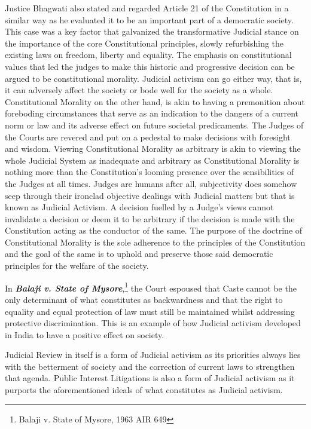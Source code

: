 \begin{multicols}{2}
\noi
Justice Bhagwati also stated and regarded Article 21 of the Constitution in a similar way as
he evaluated it to be an important part of a democratic society. This case was a key factor that
galvanized the transformative Judicial stance on the importance of the core Constitutional
principles, slowly refurbishing the existing laws on freedom, liberty and equality. The
emphasis on constitutional values that led the judges to make this historic and progressive
decision can be argued to be constitutional morality. Judicial activism can go either way, that
is, it can adversely affect the society or bode well for the society as a whole. Constitutional
Morality on the other hand, is akin to having a premonition about foreboding circumstances
that serve as an indication to the dangers of a current norm or law and its adverse effect on
future societal predicaments. The Judges of the Courts are revered and put on a pedestal to
make decisions with foresight and wisdom. Viewing Constitutional Morality as arbitrary is
akin to viewing the whole Judicial System as inadequate and arbitrary as Constitutional
Morality is nothing more than the Constitution’s looming presence over the sensibilities of
the Judges at all times. Judges are humans after all, subjectivity does somehow seep through
their ironclad objective dealings with Judicial matters but that is known as Judicial Activism.
A decision fuelled by a Judge’s views cannot invalidate a decision or deem it to be arbitrary
if the decision is made with the Constitution acting as the conductor of the same. The purpose
of the doctrine of Constitutional Morality is the sole adherence to the principles of the
Constitution and the goal of the same is to uphold and preserve those said democratic
principles for the welfare of the society.

\noi
In \textbf{\textit{Balaji v. State of Mysore}},\footnote{Balaji v. State of Mysore, 1963 AIR 649} the Court espoused that Caste cannot be the only determinant of what constitutes as backwardness and that the right to equality and equal protection of law must still be maintained whilst addressing protective discrimination. This is an example of
how Judicial activism developed in India to have a positive effect on society.

\noi
Judicial Review in itself is a form of Judicial activism as its priorities always lies with the
betterment of society and the correction of current laws to strengthen that agenda. Public Interest Litigations is also a form of Judicial activism as it purports the aforementioned ideals
of what constitutes as Judicial activism. 


\end{multicols}
